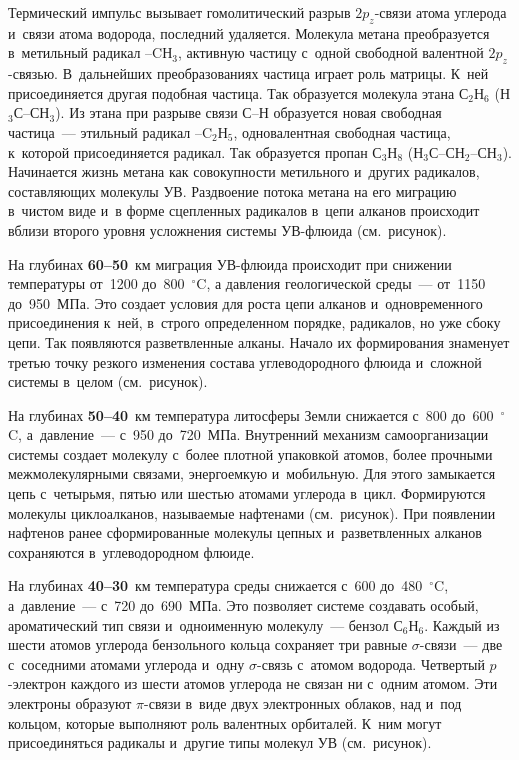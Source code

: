 \begin{multicols}{2}
    Термический импульс вызывает гомолитический разрыв $2p_z$-свя\-зи атома 
углерода и~связи атома водорода, последний удаляется. Молекула метана 
преобразуется в~метильный радикал --CН$_3$, активную частицу с~одной 
свободной валентной \mbox{$2p_z$-связью}. В~дальнейших преобразованиях частица играет 
роль матрицы. К~ней присоединяется другая подобная частица. Так образуется 
молекула этана С$_2$Н$_6$ (Н$_3$С--СН$_3$). Из этана при разрыве связи \mbox{С--Н} 
образуется новая свободная частица~--- этильный радикал --C$_2$Н$_5$, 
одновалентная свободная частица, к~которой присоединяется радикал. Так 
образуется пропан С$_3$Н$_8$ (Н$_3$С--СН$_2$--СН$_3$). Начинается жизнь 
метана как совокупности метильного и~других радикалов, составляющих  
мо\-ле\-ку\-лы УВ. Раздвоение потока метана на его миграцию в~чистом виде и~в 
форме сцепленных радикалов в~цепи алканов происходит вблизи второго уровня 
усложнения системы УВ-флюида (см.\ рисунок).
    
    На глубинах \textbf{60--50}~км миграция УВ-флюида происходит при 
снижении температуры от~1200 до~800~$^\circ$C, а давления 
геологической среды~--- от~1150 до~950~МПа. Это создает условия для роста цепи 
алканов и~одновременного присоединения к~ней, в~строго определенном порядке, 
радикалов, но уже сбоку цепи. Так появляются разветвленные алканы. Начало их 
формирования знаменует третью точку резкого изменения состава углеводородного флю\-ида 
и~сложной системы в~целом (см.\ рисунок).
    
    На глубинах \textbf{50--40}~км температура литосферы Земли снижается 
с~800 до~600~$^\circ$C, а~давление~--- с~950 до~720~МПа. 
Внутренний механизм самоорганизации системы создает молекулу с~более 
плот\-ной упаковкой атомов, более прочными межмолекулярными связами, 
энергоемкую и~мобильную. Для этого замыкается цепь с~четырьмя, пятью или 
шестью атомами углерода в~цикл. Формируются молекулы циклоалканов, 
называемые нафтенами (см.\ рисунок). При появлении нафтенов ранее 
сформированные молекулы цепных и~разветвленных алканов сохраняются  
в~углеводородном флюиде.
    
    На глубинах \textbf{40--30}~км температура среды снижается 
с~600 до~480~$^\circ$C, а~давление~--- с~720 до~690~МПа. Это позволяет 
системе создавать особый, ароматический тип связи и~одноименную молекулу~--- 
бензол С$_6$Н$_6$. Каждый из шести атомов углерода бензольного кольца 
сохраняет три равные $\sigma$-свя\-зи~--- две с~соседними атомами углерода 
и~одну  
$\sigma$-связь с~атомом водорода. Четвертый $p$-элект\-рон каждого из шести 
атомов углерода не связан ни с~одним атомом. Эти электроны образуют  
$\pi$-свя\-зи в~виде двух электронных облаков, над и~под кольцом, которые 
выполняют роль валентных орбиталей. К~ним могут присоединяться 
радикалы и~другие типы молекул УВ (см.\ рисунок). 
    

\end{multicols}
